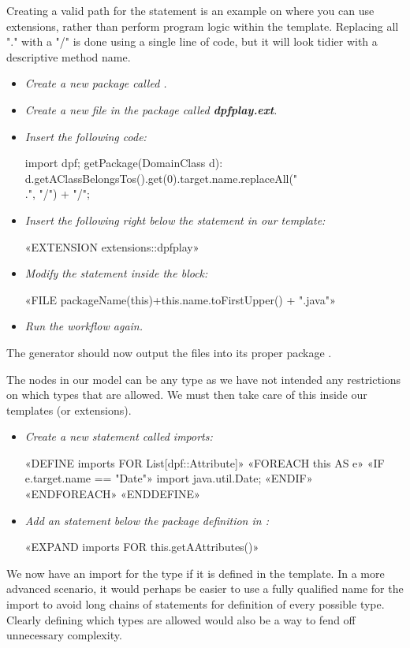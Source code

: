 Creating a valid path for the  statement is an example on where you can use extensions, rather than perform program logic within the template. Replacing all "." with a "/" is done using a single line of code, but it will look tidier with a descriptive method name.
\begin{itemize}
  \item \emph{Create a new package called .}
  \item \emph{Create a new file in the  package called \textbf{dpfplay.ext}.}
  \item \emph{Insert the following code:}
  \begin{plainlisting}
import dpf;
getPackage(DomainClass d):
    d.getAClassBelongsTos().get(0).target.name.replaceAll("\\.", "/") + "/";
  \end{plainlisting}
  \item \emph{Insert the following right below the  statement in our template:}
  \begin{plainlisting}
«EXTENSION extensions::dpfplay»
  \end{plainlisting}
  \item \emph{Modify the  statement inside the  block:}
  \begin{plainlisting}
«FILE packageName(this)+this.name.toFirstUpper() + ".java"»
  \end{plainlisting}
  \item \emph{Run the workflow again.}
\end{itemize}
The generator should now output the files into its proper package .

The  nodes in our model can be any type as we have not intended any restrictions on which types that are allowed. We must then take care of this inside our templates (or extensions).
\begin{itemize}
  \item \emph{Create a new  statement called imports:}
  \begin{plainlisting}
«DEFINE imports FOR List[dpf::Attribute]»
    «FOREACH this AS e»
	«IF e.target.name == "Date"»
	    import java.util.Date;
	«ENDIF»
    «ENDFOREACH»
«ENDDEFINE»
  \end{plainlisting}
  \item \emph{Add an  statement below the package definition in :}
  \begin{plainlisting}
«EXPAND imports FOR this.getAAttributes()»
  \end{plainlisting}
\end{itemize}
We now have an import for the  type if it is defined in the template. In a more advanced scenario, it would perhaps be easier to use a fully qualified name for the import to avoid long chains of  statements for definition of every possible type. Clearly defining which types are allowed would also be a way to fend off unnecessary complexity.

